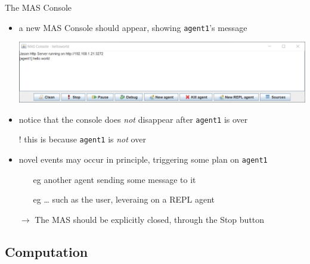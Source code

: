 \documentclass[presentation]{beamer}\mode<presentation>{\usetheme{AMSBolognaFC}}
\begin{document}
\begin{frame}[c]{The MAS Console}

    \begin{itemize}
        \item a new \alert{MAS Console} should appear, showing \texttt{agent1}'s message
        \begin{center}
            \includegraphics[width=\linewidth]{figures/mas-console.png}
        \end{center}
        
        \vfill
        
        \item notice that the console does \emph{not} disappear after \texttt{agent1} is over 
        
        \vfill
        
        \item[!] this is because \texttt{agent1} is \emph{not} over
    
        \vfill
        
        \item novel events may occur in principle, triggering some plan on \texttt{agent1}
        \begin{itemize}
             \item[eg] another agent sending some message to it
             \item[eg] \ldots{} such as the user, leveraing on a REPL agent
        \end{itemize}
        
        \vfill
        
        \item[$\rightarrow$] The MAS should be explicitly closed, through the \alert{Stop} button
    \end{itemize}
\end{frame} 

\subsection{Computation}
\end{document}
